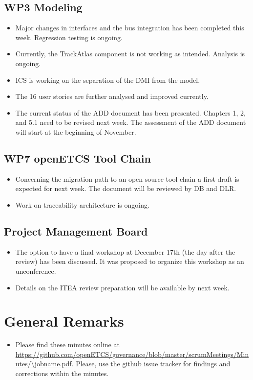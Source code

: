 \documentclass[a4paper, 11pt]{article}
\begin{document}
\subsection{WP3 Modeling}
\begin{itemize}
\item Major changes in interfaces and the bus integration has been completed this week. Regression testing is ongoing.
\item Currently, the TrackAtlas component is not working as intended. Analysis is ongoing.
\item ICS is working on the separation of the DMI from the model.
\item The 16 user stories are further analysed and improved currently.
\item The current status of the ADD document has been presented. Chapters 1, 2, and 5.1 need to be revised next week. The assessment of the ADD document will start at the beginning of November.
\end{itemize}

\subsection{WP7 openETCS Tool Chain}
\begin{itemize}
\item Concerning the migration path to an open source tool chain a first draft is expected for next week. The document will be reviewed by DB and DLR.
\item Work on traceability architecture is ongoing.
\end{itemize}

\subsection{Project Management Board}
\begin{itemize}
\item The option to have a final workshop at December 17th (the day after the review) has been discussed. It was proposed to organize this workshop as an unconference.
\item Details on the ITEA review preparation will be available by next week.
\end{itemize}

\section{General Remarks}

\begin{itemize}
\item Please find these minutes online at \url{https://github.com/openETCS/governance/blob/master/scrumMeetings/Minutes/\jobname.pdf}. Please, use the github issue tracker for findings and corrections within the minutes.
\end{itemize}
\end{document}
